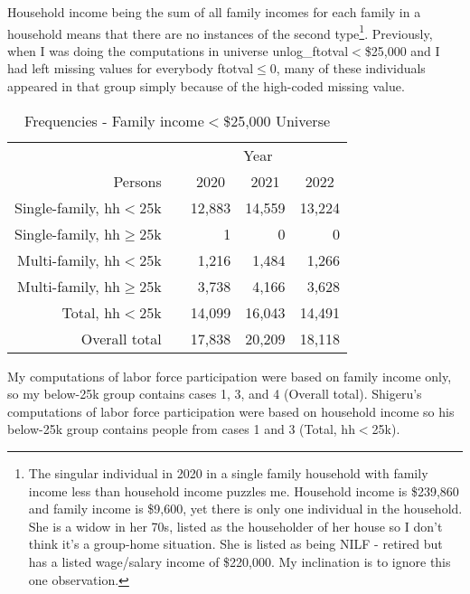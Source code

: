 \documentclass{article}
\newcommand{\mct}[1]{\multicolumn{1}{c}{#1}}
\newcommand{\mc}[3]{\multicolumn{#1}{#2}{#3}}
\begin{document}
	Household income being the sum of all family incomes for each family in a household means that there are no instances of the second type\footnote{The singular individual in 2020 in a single family household with family income less than household income puzzles me. Household income is \$239,860 and family income is \$9,600, yet there is only one individual in the household. She is a widow in her 70s, listed as the householder of her house so I don't think it's a group-home situation. She is listed as being NILF - retired but has a listed wage/salary income of \$220,000. My inclination is to ignore this one observation.}. Previously, when I was doing the computations in universe unlog\_ftotval$<$\$25,000 and I had left missing values for everybody ftotval$\le$0, many of these individuals appeared in that group simply because of the high-coded missing value.
	
	\begin{table}[H]
		\centering
		\caption{Frequencies - Family income$<$\$25,000 Universe}
		\begin{tabularx}{0.8\textwidth}{@{\extracolsep{\fill}}r r r r r }
			\toprule 
			& \mc{4}{c}{Year}  \\ \cmidrule(lr){2-5}
			Persons 	& 		&	\mct{2020}	&	\mct{2021}	&	\mct{2022}	\\ \midrule
			Single-family, hh$<$25k \hspace{0.1cm} 		&	&	12,883	&	14,559	&	13,224	\\	
			Single-family, hh$\ge$25k \hspace{0.1cm} 		&	&	1	&	0	&	0	\\	
		
			Multi-family, hh$<$25k \hspace{0.1cm}  	&	&	1,216	&	1,484	&	1,266	\\
			Multi-family, hh$\ge$25k \hspace{0.1cm}  	&	&	3,738	&	4,166	&	3,628	\\
			\midrule
			Total, hh$<$25k \hspace{0.1cm}  	&	&	14,099	&	16,043	&	14,491	\\
			Overall total \hspace{0.1cm}  	&	&	17,838	&	20,209	&	18,118	\\
			\bottomrule
		\end{tabularx}
		\vspace{1mm}
		\vspace{1mm}
	\end{table}
	
	
	My computations of labor force participation were based on family income only, so my below-25k group contains cases 1, 3, and 4 (Overall total). Shigeru's computations of labor force participation were based on household income so his below-25k group contains people from cases 1 and 3 (Total, hh$<$25k).
\end{document}
